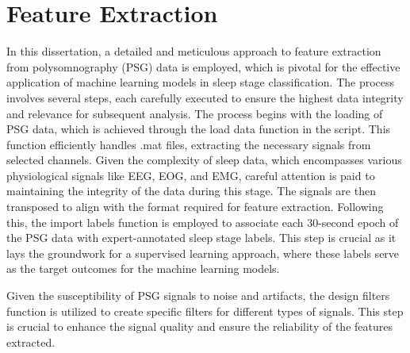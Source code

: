 \documentclass[12pt, a4paper,oneside]{book}
\numberwithin{equation}{section}
\begin{document}
\section{Feature Extraction}
In this dissertation, a detailed and meticulous approach to feature extraction from polysomnography (PSG) data is employed, which is pivotal for the effective application of machine learning models in sleep stage classification. The process involves several steps, each carefully executed to ensure the highest data integrity and relevance for subsequent analysis.\newline
The process begins with the loading of PSG data, which is achieved through the load data function in the script. This function efficiently handles .mat files, extracting the necessary signals from selected channels. Given the complexity of sleep data, which encompasses various physiological signals like EEG, EOG, and EMG, careful attention is paid to maintaining the integrity of the data during this stage. The signals are then transposed to align with the format required for feature extraction.\newline
Following this, the import labels function is employed to associate each 30-second epoch of the PSG data with expert-annotated sleep stage labels. This step is crucial as it lays the groundwork for a supervised learning approach, where these labels serve as the target outcomes for the machine learning models.

Given the susceptibility of PSG signals to noise and artifacts, the design filters function is utilized to create specific filters for different types of signals. This step is crucial to enhance the signal quality and ensure the reliability of the features extracted.
\end{document}
